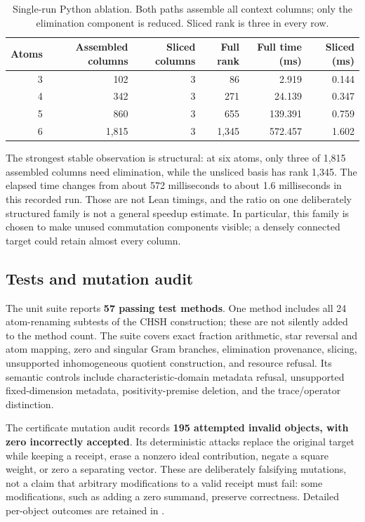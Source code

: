 \begin{table}[ht]
\centering\small
\begin{tabular}{@{}rrrrrr@{}}
\toprule Atoms & Assembled columns & Sliced columns & Full rank & Full time (ms) & Sliced (ms)\\
\midrule
3 & 102 & 3 & 86 & 2.919 & 0.144 \\
4 & 342 & 3 & 271 & 24.139 & 0.347 \\
5 & 860 & 3 & 655 & 139.391 & 0.759 \\
6 & 1,815 & 3 & 1,345 & 572.457 & 1.602 \\
\bottomrule
\end{tabular}
\caption{Single-run Python ablation. Both paths assemble all context columns;
only the elimination component is reduced. Sliced rank is three in every row.}
\label{tab:slicing}
\end{table}

The strongest stable observation is structural: at six atoms, only three of
1,815 assembled columns need elimination, while the unsliced basis has rank
1,345. The elapsed time changes from about 572 milliseconds to about
1.6 milliseconds in this recorded run. Those are not Lean timings, and the
ratio on one deliberately structured family is not a general speedup estimate.
In particular, this family is chosen to make unused commutation components
visible; a densely connected target could retain almost every column.

\subsection{Tests and mutation audit}

The unit suite reports \textbf{57 passing test methods}. One method includes all
24 atom-renaming subtests of the CHSH construction; these are not silently added
to the method count. The suite covers exact fraction arithmetic, star reversal
and atom mapping, zero and singular Gram branches, elimination provenance,
slicing, unsupported inhomogeneous quotient construction, and resource refusal.
Its semantic controls include characteristic-domain metadata refusal,
unsupported fixed-dimension metadata, positivity-premise deletion, and the
trace/operator distinction.

The certificate mutation audit records \textbf{195 attempted invalid objects,
with zero incorrectly accepted}. Its deterministic attacks replace the original
target while keeping a receipt, erase a nonzero ideal contribution, negate a
square weight, or zero a separating vector. These are deliberately falsifying
mutations, not a claim that arbitrary modifications to a valid receipt must
fail: some modifications, such as adding a zero summand, preserve correctness.
Detailed per-object outcomes are retained in .

